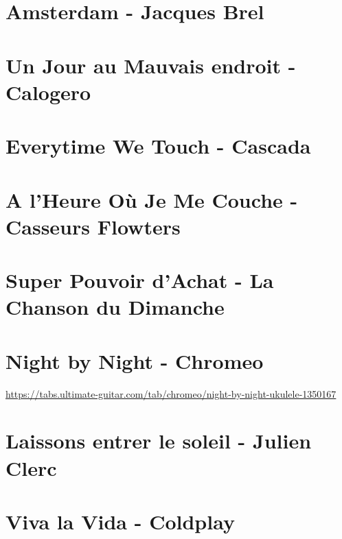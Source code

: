 \documentclass[11pt]{article}
\begin{document}
\section{Amsterdam - Jacques Brel}



\section{Un Jour au Mauvais endroit - Calogero}
\begin{guitar}

\end{guitar}

\section{Everytime We Touch - Cascada}


\section{A l'Heure Où Je Me Couche - Casseurs Flowters}
\begin{guitar}

\end{guitar}

\section{Super Pouvoir d'Achat - La Chanson du Dimanche}


\section*{Night by Night - Chromeo}
\begin{guitar}
\url{https://tabs.ultimate-guitar.com/tab/chromeo/night-by-night-ukulele-1350167}
\end{guitar}

\section{Laissons entrer le soleil - Julien Clerc}


\section{Viva la Vida - Coldplay}
\begin{guitar}

\end{guitar}
\end{document}

